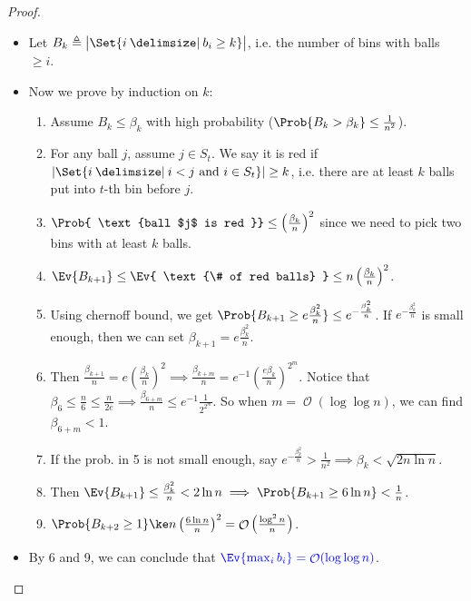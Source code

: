 \documentclass[a4paper]{article}
\DeclarePairedDelimiter{\abs}{\lvert}{\rvert}
\DeclareMathOperator{\Ord}{\mathcal{O}}
\providecommand\given{}
\newcommand*\SetSymbol[1][]{%
  \nonscript\:#1\vert
  \allowbreak
  \nonscript\:
\mathopen{}}
\renewcommand\given{\SetSymbol[\delimsize]}
\renewcommand\given{\SetSymbol[\delimsize]}
\theoremstyle{mystyle}
\begin{document}
\begin{proof} \mbox{}
  \begin{itemize}
    \item Let $B_k \triangleq \abs[\big ]{\Set{ i \given b_i \ge k }}$,
      i.e. the number of bins with balls $\ge i$.
    \item Now we prove by induction on $k$:
      \begin{enumerate}
        \item Assume $B_k \le \beta_k$ with high probability
          ($\Prob{B_k > \beta_k} \le \frac{1}{n^2}$).
        \item For any ball $j$, assume $j \in S_t$. We say it is red if
          $\abs{\Set{ i \given i < j \text{ and } i \in S_t}} \ge k$,
          i.e. there are at least $k$ balls put into $t$-th bin before $j$.
        \item $\Prob{ \text{ball $j$ is red }} \le \left(\frac{\beta_k}{n}\right)^2$
          since we need to pick two bins with at least $k$ balls.
        \item $\Ev{B_{k+1}} \le \Ev{ \text{\# of red balls} } \le
          n\left(\frac{\beta_k}{n}\right)^2$.
        \item Using chernoff bound, we get
          $\Prob{B_{k+1} \ge e\frac{\beta_k^2}{n}} \le e^{-\frac{\beta_k^2}{n}}$.
          If $e^{-\frac{\beta_k^2}{n}}$ is small enough, then we can set
          $\beta_{k+1} = e\frac{\beta_k^2}{n}$.
        \item Then $\frac{\beta_{k+1}}{n} = e\left(\frac{\beta_k}{n}\right)^2
          \implies \frac{\beta_{k+m}}{n} = e^{-1} \left(\frac{e\beta_k}{n}\right)^{2^m}$.
          Notice that $\beta_6 \le \frac{n}{6} \le \frac{n}{2e}
          \implies \frac{\beta_{6+m}}{n} \le e^{-1} \frac{1}{2^{2^m}}$.
          So when $m = \Ord(\log \log n)$, we can find $\beta_{6+m} < 1$.
        \item If the prob. in 5 is not small enough, say
          $e^{-\frac{\beta_k^2}{n}} > \frac{1}{n^2} \implies \beta_k < \sqrt{2n \ln n}$.
        \item Then $\Ev{B_{k+1}} \le \frac{\beta_k^2}{n} < 2 \ln n
          \implies \Prob{B_{k+1} \ge 6 \ln n} < \frac{1}{n}$.
        \item $\Prob{B_{k+2} \ge 1} \ke n \left(\frac{6 \ln n}{n}\right)^2
          = \Ord\left(\frac{\log^2 n}{n}\right)$.
      \end{enumerate}
    \item By 6 and 9, we can conclude that 
      ${\color{blue} \Ev{ \max_i b_i } = \Ord(\log \log n)}$.
      \qedhere
  \end{itemize}
\end{proof}
\end{document}
